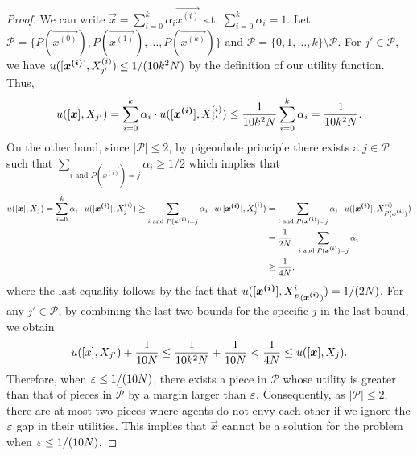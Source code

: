 \begin{proof}
    We can write $\vec{x} = \sum_{i=0}^k \alpha_i \vec{x^{(i)}}$ s.t. $\sum_{i=0}^k \alpha_i=1$. Let $\mathcal{P} = \{P(\vec{x^{(0)}}), P(\vec{x^{(1)}}), \ldots, P(\vec{x^{(k)}})\}$ and $\overline{\mathcal{P}} = \{0, 1, \ldots, k\} \setminus \mathcal{P}$. For $j' \in \overline{\mathcal{P}}$, we have $u([\boldsymbol{x^{(i)}}], X^{(i)}_{j'}) \leq 1/(10k^2N)$ by the definition of our utility function. Thus, 
    \begin{align*}
        u([\boldsymbol{x}], X_{j'}) = \sum_{i=0}^k \alpha_i \cdot u([\boldsymbol{x^{(i)}}], X^{(i)}_{j'}) \leq \frac{1}{10k^2 N} \sum_{i=0}^k \alpha_i =  \frac{1}{10k^2 N}.
    \end{align*}
    On the other hand, since $|\mathcal{P}| \leq 2$, by pigeonhole principle there exists a $j \in \mathcal{P}$ such that $\sum_{i \text{ and } P(\vec{x^{(i)}}) = j} \alpha_i \geq 1/2$ which implies that 
    \begin{align*}
        u([\boldsymbol{x}], X_{j}) = \sum_{i=0}^k \alpha_i \cdot u([\boldsymbol{x^{(i)}}], X^{(i)}_{j}) \geq \sum_{i \text{ and } P(\boldsymbol{x^{(i)}}) = j} \alpha_i \cdot u([\boldsymbol{x^{(i)}}], X^{(i)}_{j}) &=   \sum_{i \text{ and } P(\boldsymbol{x^{(i)}}) = j} \alpha_i \cdot u([\boldsymbol{x^{(i)}}], X^{(i)}_{P(\boldsymbol{x^{(i)}})}) \\ 
        & = \frac{1}{2N} \cdot \sum_{i \text{ and } P(\boldsymbol{x^{(i)}}) = j} \alpha_i\\
        &\geq \frac{1}{4N},
    \end{align*}
    where the last equality follows by the fact that $u([\boldsymbol{x^{(i)}}], X^i_{P(\boldsymbol{x^{(i)}})}) = 1/(2N)$. For any $j' \in \overline{\mathcal{P}}$, by combining the last two bounds for the specific $j$ in the last bound, we obtain
    \begin{align*}
        u([x], X_{j'}) + \frac{1}{10N} \leq \frac{1}{10k^2 N} + \frac{1}{10N} < \frac{1}{4N} \leq u([\boldsymbol{x}], X_j).
    \end{align*}
    Therefore, when $\varepsilon \leq 1/(10N)$, there exists a piece in $\mathcal{P}$ whose utility is greater than that of pieces in $\overline{\mathcal{P}}$ by a margin larger than $\varepsilon$. Consequently, as $|\mathcal{P}| \leq 2$, there are at most two pieces where agents do not envy each other if we ignore the $\varepsilon$ gap in their utilities. This implies that $\vec{x}$ cannot be a solution for the \mccs{} problem when $\varepsilon \leq 1/(10N)$.
\end{proof}



